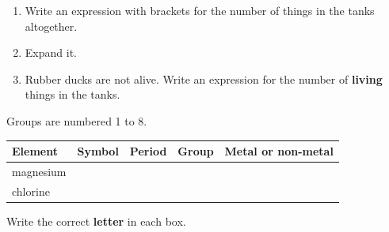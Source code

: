 \documentclass[12pt,a4paper]{article}
\newcommand{\ansline}[1][4.4cm]{\par\vspace{2pt}\hspace*{\fill}\blank[#1]\par}
\begin{document}
\vspace{4pt}
\begin{enumerate}[label=(\alph*), itemsep=9pt]
  \item Write an expression with brackets for the number of things in the tanks
        altogether. \ansline
  \item Expand it. \hfill \blank[4.4cm]
  \item Rubber ducks are not alive. Write an expression for the number of
        \textbf{living} things in the tanks.
        \ansline
\end{enumerate}


%

\noindent Groups are numbered 1 to 8.

\vspace{6pt}
\noindent
\begin{tabularx}{\textwidth}{|X|p{2.0cm}|p{2.0cm}|p{2.0cm}|p{3.1cm}|}
  \hline
  \textbf{Element} & \textbf{Symbol} & \textbf{Period} & \textbf{Group} &
  \textbf{Metal or} \newline \textbf{non-metal} \\
  \hline
  magnesium \rule[-0.7em]{0pt}{2.2em} & & & & \\ \hline
  chlorine \rule[-0.7em]{0pt}{2.2em}  & & & & \\ \hline
\end{tabularx}


\noindent Write the correct \textbf{letter} in each box.
\end{document}
